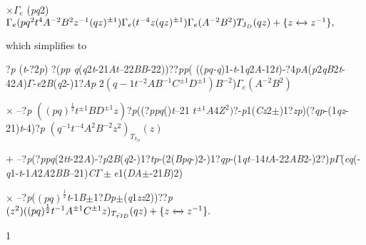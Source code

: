 \documentclass[a4paper,12pt]{article}
\begin{document}
$\times\Gamma_{e}$ ({\it pq}2) $\Gamma_{e}(pq^{2}t^{4}A^{-2}B^{2}z^{-1}(qz)^{\pm 1})\Gamma_{e}(t^{-4}z(qz)^{\pm 1})\Gamma_{e}(A^{-2}B^{2})T_{\mathrm{J}_{D}} (qz)+\{z\xleftrightarrow{}z^{-1}\},$

which simplifies to

?{\it p} ({\it t}-?2{\it p}) ?({\it pp q}({\it q}2{\it t}-21{\it At}--22{\it BB}-22))??{\it pp}( (({\it pq-q})1-{\it t}-1{\it q}2{\it A}-12{\it t})-?4{\it pA}({\it p}2{\it qB}2{\it t}-42{\it A})$\Gamma$-{\it e}2{\it B}({\it q}2-)1?{\it Ap} $2(q-1t^{-2}AB^{-1}C^{\pm 1}D^{\pm 1})B^{-2}$)$\Gamma_{e}(A^{-2}B^{2})$

$\times$ --?{\it p} $((pq)^{\frac{1}{2}}t^{\pm 1}BD^{\pm 1}z)$?{\it p}((?{\it ppq}(){\it t}--21 $t^{\pm 1}A4Z^{2})$?-{\it p}1({\it Cz}2$\pm$)1?{\it zp})(?{\it qp}-(1{\it qz}-21){\it t}-4)?{\it p} $(q^{-1}t^{-4}A^{2}B^{-2}z^{2})_{T_{\mathrm{J}_{D}}}(z)$

$+$ --?{\it p}(?{\it ppq}(2{\it tt}-22{\it A})-?{\it p}2{\it B}({\it q}2-)1?{\it tp}-(2({\it Bpq}-)2-)1?{\it qp}-(1{\it qt}--14{\it tA}-22{\it AB}2-)2?){\it p}$\Gamma$({\it eq}(-{\it q}1-{\it t}-1{\it A}2{\it A}2{\it BB}--21){\it C}$\Gamma\pm${\it e}1({\it DA}$\pm$-21{\it B})2)

$\times$ --?{\it p}($(pq)^{\frac{1}{2}}${\it t}-1{\it B}$\pm$1?{\it Dp}$\pm$({\it q}1{\it zz}2))??{\it p} $(z^{2})((pq)^{\frac{1}{2}}t^{-1}A^{\pm 1}C^{\pm 1}z)_{T_{\tilde{\tau \mathrm{J}}D}}(qz)+\{z\xleftrightarrow{}z^{-1}\}.$

1
\end{document}
